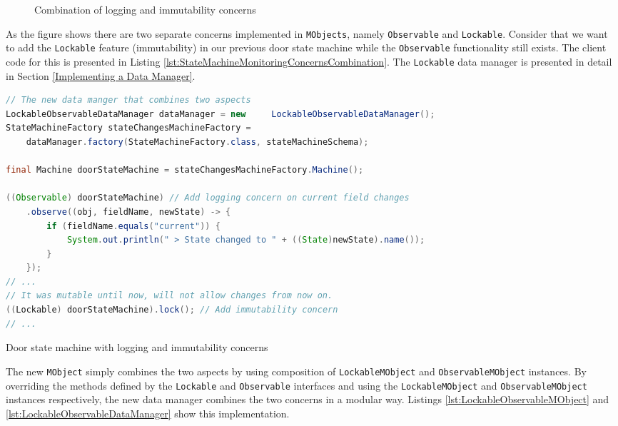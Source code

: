 \begin{figure}[H]
	\centering
  	\caption{Combination of logging and immutability concerns}
  	\label{fig:concerns_combination}
\end{figure}

As the figure shows there are two separate concerns implemented in \texttt{MObjects}, namely \texttt{Observable} and \texttt{Lockable}.
Consider that we want to add the \texttt{Lockable} feature (immutability) in our previous door state machine while the \texttt{Observable} functionality still exists.
The client code for this is presented in Listing \ref{lst:StateMachineMonitoringConcernsCombination}.
The \texttt{Lockable} data manager is presented in detail in Section \ref{Implementing a Data Manager}.

\begin{sourcecode} [H]
	\begin{lstlisting}[language=Java, escapechar=|]
// The new data manger that combines two aspects
LockableObservableDataManager dataManager = new 	LockableObservableDataManager();
StateMachineFactory stateChangesMachineFactory =
	dataManager.factory(StateMachineFactory.class, stateMachineSchema);

final Machine doorStateMachine = stateChangesMachineFactory.Machine();

((Observable) doorStateMachine) // Add logging concern on current field changes
	.observe((obj, fieldName, newState) -> {
		if (fieldName.equals("current")) {
			System.out.println(" > State changed to " + ((State)newState).name());
		}
	});
// ...
// It was mutable until now, will not allow changes from now on.
((Lockable) doorStateMachine).lock(); // Add immutability concern 
// ...
	\end{lstlisting}
	\caption{Door state machine with logging and immutability concerns}
	\label{lst:StateMachineMonitoringConcernsCombination}
\end{sourcecode}

The new \texttt{MObject} simply combines the two aspects by using composition of \texttt{LockableMObject} and \texttt{ObservableMObject} instances.
By overriding the methods defined by the \texttt{Lockable} and \texttt{Observable} interfaces and using the \texttt{LockableMObject} and \texttt{ObservableMObject} instances respectively, the new data manager combines the two concerns in a modular way.
Listings \ref{lst:LockableObservableMObject} and \ref{lst:LockableObservableDataManager} show this implementation.

